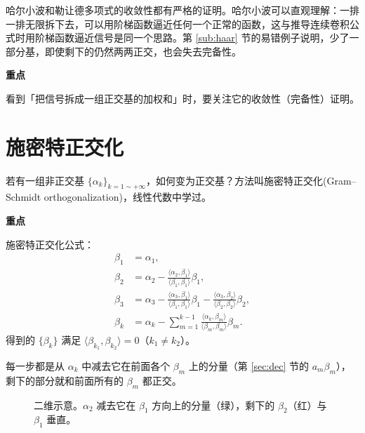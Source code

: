 \documentclass[UTF8,a4paper,11pt]{ctexart}
\newenvironment{remember}{\begin{rememberbox}\textbf{重点}\par\smallskip}{\end{rememberbox}}
\newcounter{ex}[section]
\begin{document}
哈尔小波和勒让德多项式的收敛性都有严格的证明。哈尔小波可以直观理解：一排一排无限拆下去，可以用阶梯函数逼近任何一个正常的函数，这与推导连续卷积公式时用阶梯函数逼近信号是同一个思路。第 \ref{sub:haar} 节的易错例子说明，少了一部分基，即使剩下的仍然两两正交，也会失去完备性。

\begin{remember}
看到「把信号拆成一组正交基的加权和」时，要关注它的收敛性（完备性）证明。
\end{remember}

\section{施密特正交化}\label{sec:gs}
若有一组非正交基 $\{\alpha_k\}_{k=1\sim+\infty}$，如何变为正交基？方法叫施密特正交化(Gram--Schmidt orthogonalization)，线性代数中学过。

\begin{remember}
施密特正交化公式：
\begin{align*}
\beta_1&=\alpha_1,\\
\beta_2&=\alpha_2-\frac{\langle\alpha_2,\beta_1\rangle}{\langle\beta_1,\beta_1\rangle}\beta_1,\\
\beta_3&=\alpha_3-\frac{\langle\alpha_3,\beta_1\rangle}{\langle\beta_1,\beta_1\rangle}\beta_1-\frac{\langle\alpha_3,\beta_2\rangle}{\langle\beta_2,\beta_2\rangle}\beta_2,\\
\beta_k&=\alpha_k-\sum_{m=1}^{k-1}\frac{\langle\alpha_k,\beta_m\rangle}{\langle\beta_m,\beta_m\rangle}\beta_m .
\end{align*}
得到的 $\{\beta_k\}$ 满足 $\langle\beta_{k_1},\beta_{k_2}\rangle=0$（$k_1\ne k_2$）。
\end{remember}
每一步都是从 $\alpha_k$ 中减去它在前面各个 $\beta_m$ 上的分量（第 \ref{sec:dec} 节的 $a_m\beta_m$），剩下的部分就和前面所有的 $\beta_m$ 都正交。

\begin{figure}[H]
\centering
{}
\caption{二维示意。$\alpha_2$ 减去它在 $\beta_1$ 方向上的分量（绿），剩下的 $\beta_2$（红）与 $\beta_1$ 垂直。}
\end{figure}
\end{document}
